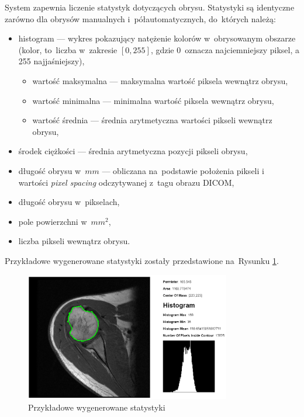 \documentclass[a4paper,11pt,twoside,openright]{report}
\theoremstyle{definition}
\begin{document}
System zapewnia liczenie statystyk dotyczących obrysu. Statystyki są identyczne
zarówno dla obrysów manualnych i~półautomatycznych, do~których należą:

\begin{itemize}[noitemsep]
\item histogram --- wykres pokazujący natężenie kolorów w~obrysowanym obszarze
(kolor, to~liczba w~zakresie $[0,255]$, gdzie 0~oznacza najciemniejszy piksel,
a 255 najjaśniejszy),
\begin{itemize}[noitemsep]
\item wartość maksymalna --- maksymalna wartość piksela wewnątrz obrysu,
\item wartość minimalna --- minimalna wartość piksela wewnątrz obrysu,
\item wartość średnia --- średnia arytmetyczna wartości pikseli wewnątrz obrysu,
\end{itemize}
\item środek ciężkości --- średnia arytmetyczna pozycji pikseli obrysu,
\item długość obrysu w~$mm$ --- obliczana na~podstawie położenia pikseli i~%
wartości \textit{pixel spacing} odczytywanej z~tagu obrazu DICOM,
\item długość obrysu w~pikselach,
\item pole powierzchni w~$mm^2$,
\item liczba pikseli wewnątrz obrysu.
\end{itemize}

Przykładowe wygenerowane statystyki zostały przedstawione na~Rysunku \ref{fig:107b}.

\begin{figure}[h!]
	\center
	\includegraphics[width=0.8\textwidth]{107}
	\caption{Przykładowe wygenerowane statystyki}
    	\label{fig:107b}
\end{figure}
\end{document}
